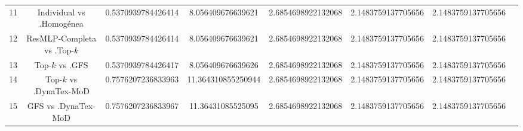 \documentclass[a4paper,10pt]{article}
\begin{document}
\begin{landscape}
\begin{table}[!htp]
\begin{tabular}{cccccccc}
11&Individual vs .Homogénea&0.5370939784426414&8.056409676639621&2.6854698922132068&2.1483759137705656&2.1483759137705656\\
12&ResMLP-Completa vs .Top-$k$&0.5370939784426414&8.056409676639621&2.6854698922132068&2.1483759137705656&2.1483759137705656\\
13&Top-$k$ vs .GFS&0.5370939784426417&8.056409676639626&2.6854698922132068&2.1483759137705656&2.1483759137705656\\
14&Top-$k$ vs .DynaTex-MoD&0.7576207236833963&11.364310855250944&2.6854698922132068&2.1483759137705656&2.1483759137705656\\
15&GFS vs .DynaTex-MoD&0.7576207236833967&11.36431085525095&2.6854698922132068&2.1483759137705656&2.1483759137705656\\
\hline
\end{tabular}
\end{table}

\end{landscape}
\end{document}
